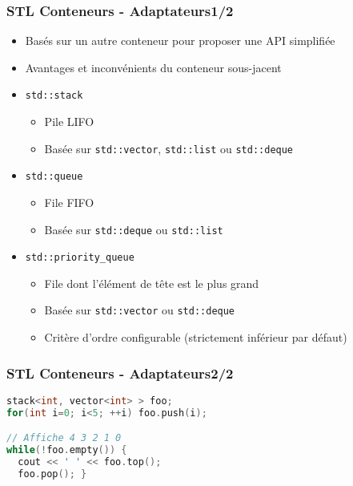 \documentclass[C++.tex]{subfiles}
\begin{document}
\begin{frame}
	\frametitle{STL Conteneurs - Adaptateurs\titlehfill{}1/2}
	\begin{itemize}
		\item Basés sur un autre conteneur pour proposer une API simplifiée
		\item Avantages et inconvénients du conteneur sous-jacent
		\item \lstinline|std::stack|
		\begin{itemize}
			\item Pile LIFO
			\item Basée sur \lstinline|std::vector|, \lstinline|std::list| ou \lstinline|std::deque|
		\end{itemize} 
		\item \lstinline|std::queue|
		\begin{itemize}
			\item File FIFO
			\item Basée sur \lstinline|std::deque| ou \lstinline|std::list|
		\end{itemize} 
		\item \lstinline|std::priority_queue|
		\begin{itemize}
			\item File dont l'élément de tête est le plus grand
			\item Basée sur \lstinline|std::vector| ou \lstinline|std::deque|
			\item Critère d'ordre configurable (strictement inférieur par défaut)
		\end{itemize} 
	\end{itemize}
\end{frame}

\begin{frame}[fragile]
	\frametitle{STL Conteneurs - Adaptateurs\titlehfill{}2/2}
	\begin{lstlisting}[language=C++]
stack<int, vector<int> > foo;
for(int i=0; i<5; ++i) foo.push(i);

// Affiche 4 3 2 1 0
while(!foo.empty()) {
  cout << ' ' << foo.top();
  foo.pop(); }\end{lstlisting}
\end{frame}
\end{document}
